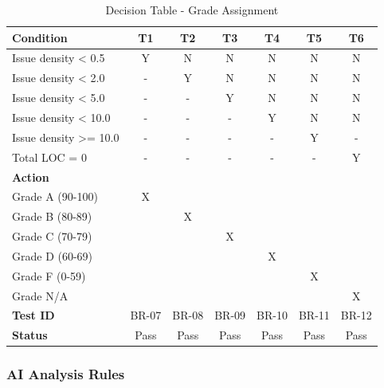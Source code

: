 \documentclass[12pt,a4paper]{article}
\begin{document}
    \begin{table}[H]
        \caption{Decision Table - Grade Assignment}
        \begin{tabular}{|l|c|c|c|c|c|c|}
            \hline
            \textbf{Condition} & \textbf{T1} & \textbf{T2} & \textbf{T3} & \textbf{T4} & \textbf{T5} & \textbf{T6} \\
            \hline
            Issue density < 0.5 & Y & N & N & N & N & N \\
            Issue density < 2.0 & - & Y & N & N & N & N \\
            Issue density < 5.0 & - & - & Y & N & N & N \\
            Issue density < 10.0 & - & - & - & Y & N & N \\
            Issue density >= 10.0 & - & - & - & - & Y & - \\
            Total LOC = 0 & - & - & - & - & - & Y \\
            \hline
            \textbf{Action} & & & & & & \\
            \hline
            Grade A (90-100) & X & & & & & \\
            Grade B (80-89) & & X & & & & \\
            Grade C (70-79) & & & X & & & \\
            Grade D (60-69) & & & & X & & \\
            Grade F (0-59) & & & & & X & \\
            Grade N/A & & & & & & X \\
            \hline
            \textbf{Test ID} & BR-07 & BR-08 & BR-09 & BR-10 & BR-11 & BR-12 \\
            \textbf{Status} & Pass & Pass & Pass & Pass & Pass & Pass \\
            \hline
        \end{tabular}
    \end{table}

    \subsubsection{AI Analysis Rules}
\end{document}

